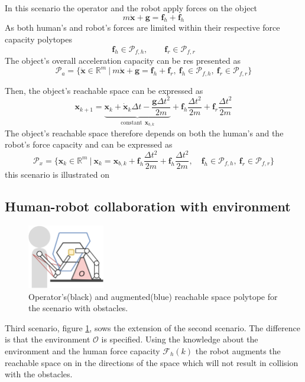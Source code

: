 In this scenario the operator and the robot apply forces on the object 
\begin{equation}
    m \ddot{\bm{x}} + \bm{g}= \bm{f}_h + \bm{f}_h
\end{equation}
As both human's and robot's forces are limited within their respective force capacity polytopes
\begin{equation}
    \bm{f}_h \in \mathcal{P}_{f,h}, \qquad  \bm{f}_r \in \mathcal{P}_{f,r}
\end{equation}
The object's overall acceleration capacity can be res presented as
\begin{equation}
    \mathcal{P}_a = \{\ddot{\bm{x}} \in \mathbb{R}^m ~|~ m \ddot{\bm{x}} + \bm{g}= \bm{f}_h +\bm{f}_r, ~\bm{f}_h \in \mathcal{P}_{f,h}, ~\bm{f}_r \in \mathcal{P}_{f,r} \}
\end{equation}

Then, the object's reachable space can be expressed as 
\begin{equation}
    \bm{x}_{k+1} = \underbrace{\bm{x}_k + \dot{\bm{x}}_k\Delta t - \frac{\bm{g} \Delta t^2}{2m}}_{\text{constant}~~\bm{x}_{b,k}}+ \bm{f}_h\frac{\Delta t^2}{2m}+ \bm{f}_r\frac{\Delta t^2}{2m}
\end{equation}
The object's reachable space therefore depends on both the human's and the robot's force capacity and can be expressed as
\begin{equation}
    \mathcal{P}_x = \{\bm{x}_k \in \mathbb{R}^m ~|~ \bm{x}_k = \bm{x}_{b,k} + \bm{f}_h\frac{\Delta t^2}{2m}+ \bm{f}_h\frac{\Delta t^2}{2m}, \quad\bm{f}_h \in \mathcal{P}_{f,h},~\bm{f}_r \in \mathcal{P}_{f,r} \}
\end{equation}
this scenario is illustrated on 

\subsection{Human-robot collaboration with environment}
\begin{figure}[htb!]
    \centering
    \includegraphics[width=0.3\textwidth]{Papers/lichie/g3.png}
    \caption{Operator's(black) and augmented(blue) reachable space polytope for the scenario with obstacles.}
    \label{fig:goal3}
\end{figure}
Third scenario, figure \ref{fig:goal3}, sows the extension of the second scenario. The difference is that the environment $\mathcal{O}$ is specified. Using the knowledge about the environment and the human force capacity $\mathcal{F}_h(k)$ the robot augments the reachable space on in the directions of the space which will not result in collision with the obstacles.

